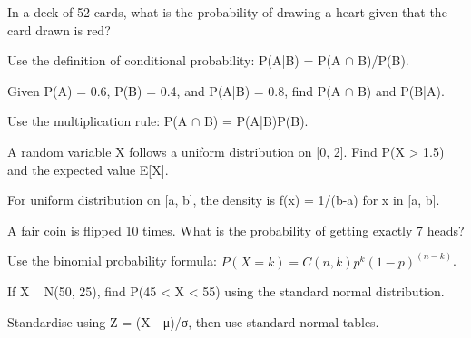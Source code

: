\begin{exercisebox}[easy]
\begin{problem}
In a deck of 52 cards, what is the probability of drawing a heart given that the card drawn is red?
\end{problem}
\begin{hintbox}
Use the definition of conditional probability: P(A|B) = P(A $\cap$ B)/P(B).
\end{hintbox}
\end{exercisebox}


\begin{exercisebox}[easy]
\begin{problem}
Given P(A) = 0.6, P(B) = 0.4, and P(A|B) = 0.8, find P(A $\cap$ B) and P(B|A).
\end{problem}
\begin{hintbox}
Use the multiplication rule: P(A $\cap$ B) = P(A|B)P(B).
\end{hintbox}
\end{exercisebox}


\begin{exercisebox}[easy]
\begin{problem}
A random variable X follows a uniform distribution on [0, 2]. Find P(X > 1.5) and the expected value E[X].
\end{problem}
\begin{hintbox}
For uniform distribution on [a, b], the density is f(x) = 1/(b-a) for x in [a, b].
\end{hintbox}
\end{exercisebox}


\begin{exercisebox}[easy]
\begin{problem}
A fair coin is flipped 10 times. What is the probability of getting exactly 7 heads?
\end{problem}
\begin{hintbox}
Use the binomial probability formula: $P(X = k) = C(n,k) p^k (1-p)^{(n-k)}$.
\end{hintbox}
\end{exercisebox}


\begin{exercisebox}[easy]
\begin{problem}
If X ~ N(50, 25), find P(45 < X < 55) using the standard normal distribution.
\end{problem}
\begin{hintbox}
Standardise using Z = (X - μ)/σ, then use standard normal tables.
\end{hintbox}
\end{exercisebox}


